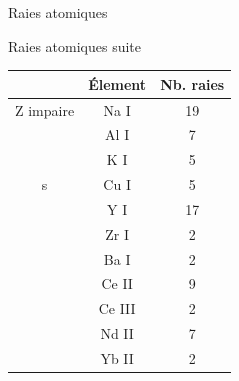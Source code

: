\documentclass[10pt]{beamer}
\begin{document}
\begin{frame}[fragile]{Raies atomiques}
\end{frame}
\begin{frame}[fragile]{Raies atomiques suite}
            \begin{table}[h!]
            \begin{center}
                \begin{tabular}{c|c|c}
                     & Élement & Nb. raies\\
                    \hline
                    Z impaire & Na I &19\\
                     & Al I &7\\
                     & K I &5 \\
                    s & Cu I & 5\\
                     & Y I & 17\\
                     & Zr I & 2\\
                     & Ba I & 2\\
                     & Ce II & 9\\
                     & Ce III & 2\\
                     & Nd II & 7\\
                     & Yb II & 2\\
                \end{tabular}
            \end{center}
        \end{table}
\end{frame}
\end{document}
